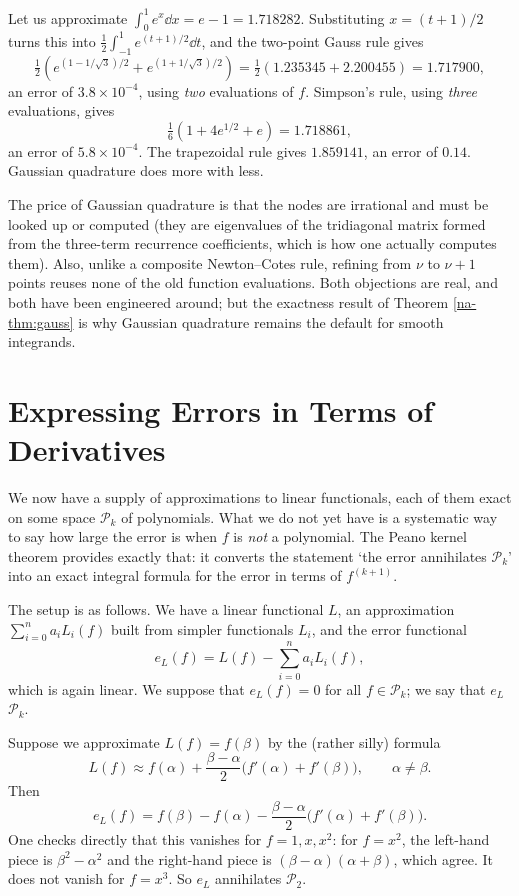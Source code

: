 \documentclass[a4paper]{scrartcl}
\newcommand{\Pn}[1]{\mathcal{P}_{#1}}
\begin{document}
\begin{example}
  Let us approximate $\int_0^1 e^x \dd x = e - 1 = 1.718282$. Substituting $x = (t+1)/2$ turns this into $\tfrac12\int_{-1}^1 e^{(t+1)/2}\dd t$, and the two-point Gauss rule gives
  $$
  \tfrac12\left(e^{(1 - 1/\sqrt3)/2} + e^{(1+1/\sqrt3)/2}\right) = \tfrac12(1.235345 + 2.200455) = 1.717900,
  $$
  an error of $3.8 \times 10^{-4}$, using \emph{two} evaluations of $f$. Simpson's rule, using \emph{three} evaluations, gives
  $$
  \tfrac16\left(1 + 4e^{1/2} + e\right) = 1.718861,
  $$
  an error of $5.8\times 10^{-4}$. The trapezoidal rule gives $1.859141$, an error of $0.14$. Gaussian quadrature does more with less.
\end{example}

\begin{remark}
  The price of Gaussian quadrature is that the nodes are irrational and must be looked up or computed (they are eigenvalues of the tridiagonal matrix formed from the three-term recurrence coefficients, which is how one actually computes them). Also, unlike a composite Newton--Cotes rule, refining from $\nu$ to $\nu+1$ points reuses none of the old function evaluations. Both objections are real, and both have been engineered around; but the exactness result of Theorem \ref{na-thm:gauss} is why Gaussian quadrature remains the default for smooth integrands.
\end{remark}


\section{Expressing Errors in Terms of Derivatives}

We now have a supply of approximations to linear functionals, each of them exact on some space $\Pn{k}$ of polynomials. What we do not yet have is a systematic way to say how large the error is when $f$ is \emph{not} a polynomial. The Peano kernel theorem provides exactly that: it converts the statement `the error annihilates $\Pn{k}$' into an exact integral formula for the error in terms of $f^{(k+1)}$.

The setup is as follows. We have a linear functional $L$, an approximation $\sum_{i=0}^n a_i L_i(f)$ built from simpler functionals $L_i$, and the error functional
$$
e_L(f) = L(f) - \sum_{i=0}^{n}a_i L_i(f),
$$
which is again linear. We suppose that $e_L(f) = 0$ for all $f \in \Pn{k}$; we say that $e_L$  $\Pn{k}$.

\begin{example}
  Suppose we approximate $L(f) = f(\beta)$ by the (rather silly) formula
  $$
  L(f) \approx f(\alpha) + \frac{\beta - \alpha}{2}\big(f'(\alpha) + f'(\beta)\big), \qquad \alpha \neq \beta.
  $$
  Then
  $$
  e_L(f) = f(\beta) - f(\alpha) - \frac{\beta-\alpha}{2}\big(f'(\alpha) + f'(\beta)\big).
  $$
  One checks directly that this vanishes for $f = 1, x, x^2$: for $f = x^2$, the left-hand piece is $\beta^2 - \alpha^2$ and the right-hand piece is $(\beta-\alpha)(\alpha+\beta)$, which agree. It does not vanish for $f = x^3$. So $e_L$ annihilates $\Pn{2}$.
\end{example}
\end{document}
